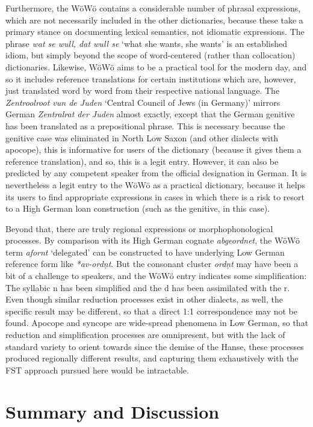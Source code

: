 \documentclass[11pt]{article}
\newcommand{\word}[1]{\textsl{#1}} %
\begin{document}
Furthermore, the WöWö contains a considerable number of phrasal expressions, which are not necessarily included in the other dictionaries, because these take a primary stance on documenting lexical semantics, not idiomatic expressions. The phrase \word{wat se wull, dat wull se} `what she wants, she wants' is an established idiom, but simply beyond the scope of word-centered (rather than collocation) dictionaries. Likewise, WöWö aims to be a practical tool for the modern day, and so it includes reference translations for certain institutions which are, however, just translated word by word from their respective national language. The \word{Zentroolroot vun de Juden} `Central Council of Jews (in Germany)' mirrors German \word{Zentralrat der Juden} almost exactly, except that the German genitive has been translated as a prepositional phrase. This is necessary because the genitive case was eliminated in North Low Saxon (and other dialects with apocope), this is informative for users of the dictionary (because it gives them a reference translation), and so, this is a legit entry. However, it can also be predicted by any competent speaker from the official designation in German. It is nevertheless a legit entry to the WöWö as a practical dictionary, because it helps its users to find appropriate expressions in cases in which there is a risk to resort to a High German loan construction (such as the genitive, in this case).

Beyond that, there are truly regional expressions or morphophonological processes. By comparison with its High German cognate \word{abgeordnet}, the WöWö term \word{afornt} `delegated' can be constructed to have underlying Low German reference form like \word{*av-ordņt}. But the consonant cluster \word{ordņt} may have been a bit of a challenge to speakers, and the WöWö entry indicates some simplification: The syllabic n has been simplified and the d has been assimilated with the r. Even though similar reduction processes exist in other dialects, as well, the specific result may be different, so that a direct 1:1 correspondence may not be found. Apocope and syncope are wide-spread phenomena in Low German, so that reduction and simplification processes are omnipresent, but with the lack of standard variety to orient towards since the demise of the Hanse, these processes produced regionally different results, and capturing them exhaustively with the FST approach pursued here would be intractable.

\section{Summary and Discussion}
\end{document}
